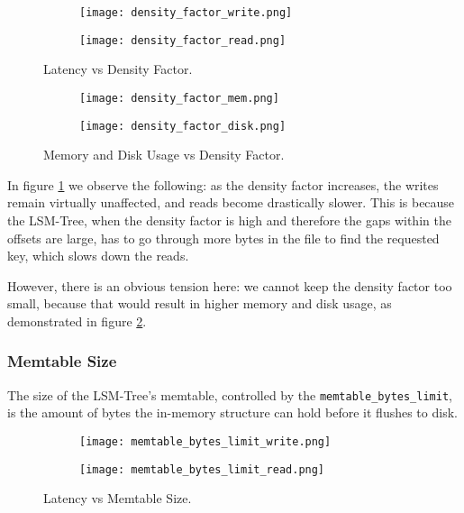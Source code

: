 \begin{figure}[h]
    \begin{subfigure}{.5\textwidth}
        \centering
        \texttt{[image: density\_factor\_write.png]}
    \end{subfigure}
    \begin{subfigure}{.5\textwidth}
        \centering
        \texttt{[image: density\_factor\_read.png]}
    \end{subfigure}
    \caption{Latency vs Density Factor.}
    \label{fig:density_factor_write_read}
\end{figure}

\begin{figure}[h]
    \begin{subfigure}{.5\textwidth}
        \centering
        \texttt{[image: density\_factor\_mem.png]}
    \end{subfigure}
    \begin{subfigure}{.5\textwidth}
        \centering
        \texttt{[image: density\_factor\_disk.png]}
    \end{subfigure}
    \caption{Memory and Disk Usage vs Density Factor.}
    \label{fig:density_factor_mem_disk}
\end{figure}

In figure \ref{fig:density_factor_write_read} we observe the following: as the density factor increases, the writes remain virtually unaffected, and reads become drastically slower. This is because the LSM-Tree, when the density factor is high and therefore the gaps within the offsets are large, has to go through more bytes in the file to find the requested key, which slows down the reads.

However, there is an obvious tension here: we cannot keep the density factor too small, because that would result in higher memory and disk usage, as demonstrated in figure \ref{fig:density_factor_mem_disk}.

\subsubsection{Memtable Size}

The size of the LSM-Tree's memtable, controlled by the \verb"memtable_bytes_limit", is the amount of bytes the in-memory structure can hold before it flushes to disk.

\begin{figure}[h]
    \begin{subfigure}{.5\textwidth}
        \centering
        \texttt{[image: memtable\_bytes\_limit\_write.png]}
    \end{subfigure}
    \begin{subfigure}{.5\textwidth}
        \centering
        \texttt{[image: memtable\_bytes\_limit\_read.png]}
    \end{subfigure}
    \caption{Latency vs Memtable Size.}
    \label{fig:memtable-bytes-limit-write-read}
\end{figure}

